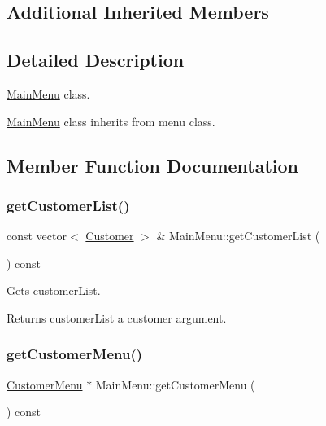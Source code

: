 \subsection*{Additional Inherited Members}


\subsection{Detailed Description}
\hyperlink{classMainMenu}{Main\+Menu} class. 

\hyperlink{classMainMenu}{Main\+Menu} class inherits from menu class. 

\subsection{Member Function Documentation}
\mbox{\label{classMainMenu_ac1e7ab45aeaf1245b7dd534e2a535ed8}} 
\subsubsection{\texorpdfstring{get\+Customer\+List()}{getCustomerList()}}
{\footnotesize\ttfamily const vector$<$ \hyperlink{classCustomer}{Customer} $>$ \& Main\+Menu\+::get\+Customer\+List (\begin{DoxyParamCaption}{ }\end{DoxyParamCaption}) const}



Gets customer\+List. 

\begin{DoxyReturn}{Returns}
customer\+List a customer argument. 
\end{DoxyReturn}
\mbox{\label{classMainMenu_a605159269deb516a64b77d9144750bbf}} 
\subsubsection{\texorpdfstring{get\+Customer\+Menu()}{getCustomerMenu()}}
{\footnotesize\ttfamily \hyperlink{classCustomerMenu}{Customer\+Menu} $\ast$ Main\+Menu\+::get\+Customer\+Menu (\begin{DoxyParamCaption}{ }\end{DoxyParamCaption}) const}



